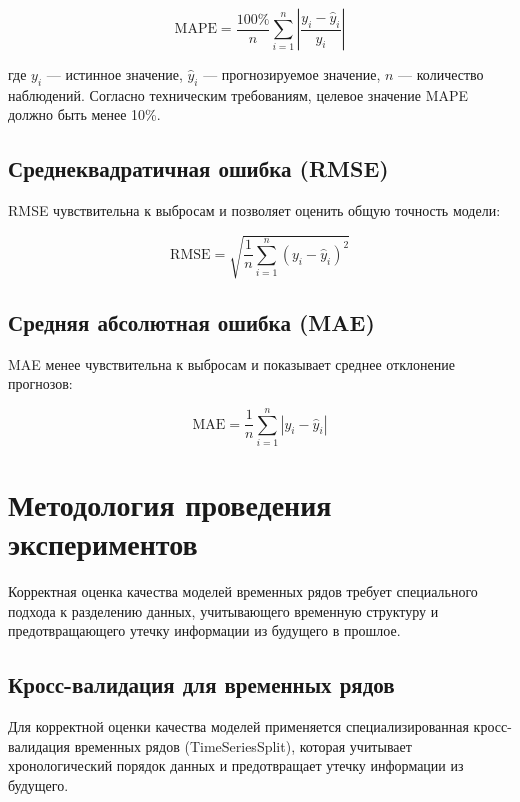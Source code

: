 \begin{equation}
	\text{MAPE} = \frac{100\%}{n} \sum_{i=1}^{n} \left| \frac{y_i - \hat{y}_i}{y_i} \right|
\end{equation}

где $y_i$ — истинное значение, $\hat{y}_i$ — прогнозируемое значение, $n$ — количество наблюдений. Согласно техническим требованиям, целевое значение MAPE должно быть менее 10\%.

\subsection{Среднеквадратичная ошибка (RMSE)}

\hspace*{1.25cm}RMSE чувствительна к выбросам и позволяет оценить общую точность модели:

\begin{equation}
	\text{RMSE} = \sqrt{\frac{1}{n} \sum_{i=1}^{n} (y_i - \hat{y}_i)^2}
\end{equation}

\subsection{Средняя абсолютная ошибка (MAE)}

\hspace*{1.25cm}MAE менее чувствительна к выбросам и показывает среднее отклонение прогнозов:

\begin{equation}
	\text{MAE} = \frac{1}{n} \sum_{i=1}^{n} |y_i - \hat{y}_i|
\end{equation}

\section{Методология проведения экспериментов}
\label{sec:experiment_methodology}

\hspace*{1.25cm}Корректная оценка качества моделей временных рядов требует специального подхода к разделению данных, учитывающего временную структуру и предотвращающего утечку информации из будущего в прошлое.

\subsection{Кросс-валидация для временных рядов}

\hspace*{1.25cm}Для корректной оценки качества моделей применяется специализированная кросс-валидация временных рядов (TimeSeriesSplit), которая учитывает хронологический порядок данных и предотвращает утечку информации из будущего.

